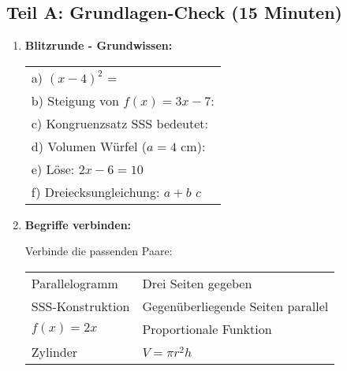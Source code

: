 \subsection*{Teil A: Grundlagen-Check (15 Minuten)}

\begin{enumerate}[label=\arabic*.]

    \item \textbf{Blitzrunde - Grundwissen:}

    \begin{tabular}{l}
        a) $(x - 4)^2$ = \underline{\hspace{4cm}} \\[2ex]
        b) Steigung von $f(x) = 3x - 7$: \underline{\hspace{2cm}} \\[2ex]
        c) Kongruenzsatz SSS bedeutet: \underline{\hspace{6cm}} \\[2ex]
        d) Volumen Würfel ($a = 4$ cm): \underline{\hspace{3cm}} \\[2ex]
        e) Löse: $2x - 6 = 10$ \underline{\hspace{4cm}} \\[2ex]
        f) Dreiecksungleichung: $a + b$ \underline{\hspace{1cm}} $c$ \\[2ex]
    \end{tabular}

    \vspace{1cm}

    \item \textbf{Begriffe verbinden:}

    Verbinde die passenden Paare:

    \begin{tabular}{ll}
        Parallelogramm & \hspace{3cm} Drei Seiten gegeben \\[0.5cm]
        SSS-Konstruktion & \hspace{3cm} Gegenüberliegende Seiten parallel \\[0.5cm]
        $f(x) = 2x$ & \hspace{3cm} Proportionale Funktion \\[0.5cm]
        Zylinder & \hspace{3cm} $V = \pi r^2 h$ \\
    \end{tabular}

\end{enumerate}